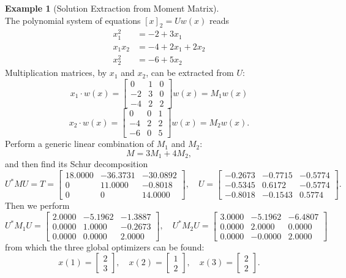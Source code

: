 \documentclass[
]{book}
\theoremstyle{definition}
\theoremstyle{definition}
\newtheorem{example}{Example}[chapter]
\theoremstyle{definition}
\theoremstyle{definition}
\theoremstyle{remark}
\begin{document}
\begin{example}[Solution Extraction from Moment Matrix]
\[\]
The polynomial system of equations \([x]_2 = U w(x)\) reads
\begin{equation}
\begin{split}
x_1^2 &= -2 + 3x_1 \\
x_1 x_2 &= -4 + 2x_1 + 2x_2 \\
x_2^2 &= -6 + 5x_2
\end{split}
\end{equation}
Multiplication matrices, by \(x_1\) and \(x_2\), can be extracted from \(U\):
\[
x_1 \cdot w(x) = \begin{bmatrix}
0 & 1 & 0 \\
-2 & 3 & 0 \\
-4 & 2 & 2
\end{bmatrix} w(x) = M_1 w(x)
\]
\[
x_2 \cdot w(x) = \begin{bmatrix}
0 & 0 & 1 \\
-4 & 2 & 2\\
-6 & 0 & 5
\end{bmatrix} w(x) = M_2 w(x).
\]
Perform a generic linear combination of \(M_1\) and \(M_2\):
\[
M = 3 M_1 + 4 M_2,
\]
and then find its Schur decomposition
\[
U^* M U = T = \begin{bmatrix}
18.0000  & -36.3731  & -30.0892\\
0   & 11.0000   & -0.8018 \\
0         & 0   & 14.0000
\end{bmatrix}, \quad U = \begin{bmatrix}
-0.2673   & -0.7715   & -0.5774\\
-0.5345    & 0.6172   & -0.5774\\
-0.8018   &-0.1543    & 0.5774
\end{bmatrix}.
\]
Then we perform
\[
U^* M_1 U = \begin{bmatrix}
2.0000  &  -5.1962   & -1.3887 \\
    0.0000    & 1.0000   & -0.2673\\
   0.0000    & 0.0000   & 2.0000
\end{bmatrix}, \quad 
U^* M_2 U = \begin{bmatrix}
3.0000   & -5.1962   & -6.4807\\
    0.0000    & 2.0000    & 0.0000\\
    0.0000   & -0.0000    & 2.0000
\end{bmatrix}
\]
from which the three global optimizers can be found:
\[
x(1) = \begin{bmatrix} 2 \\ 3 \end{bmatrix}, \quad 
x(2) = \begin{bmatrix} 1 \\ 2 \end{bmatrix}, \quad 
x(3) = \begin{bmatrix} 2 \\ 2 \end{bmatrix}.
\]
\end{example}
\end{document}
